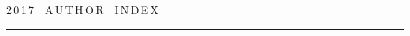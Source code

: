 

\def\leftfootline{\small{\textbf{\thepage}


\hfill СИСТЕМЫ И СРЕДСТВА ИНФОРМАТИКИ\ \ \ выпуск~27\ \ \ №~4\ \ \ 2017}


}%


 \def\rightfootline{\small{СИСТЕМЫ И СРЕДСТВА ИНФОРМАТИКИ\ \ \ выпуск~27\ \ \


№~4\ \ \ 2017


 \hfill \textbf{\thepage}}}


 \label{end\stat}





\newpage





\def\stat{cont-e}


{%




\raggedleft\Large \bf%


2\,0\,1\,7\ \ A\,U\,T\,H\,O\,R\ \ I\,N\,D\,E\,X \vskip 17pt


 \hrule


 \par




 }





\label{st\stat}

















\def\leftkol{\ } %


\def\rightkol{\ } %










\vspace*{-12pt}





